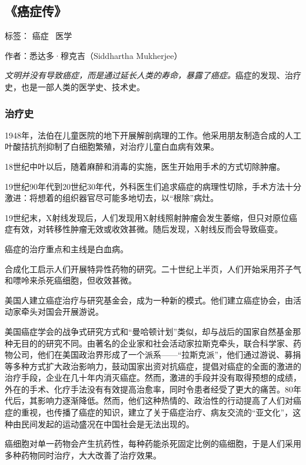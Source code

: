 \subsection{《癌症传》}

标签： 癌症 \  医学

作者：悉达多·穆克吉（Siddhartha Mukherjee）

\emph{文明并没有导致癌症，而是通过延长人类的寿命，暴露了癌症。}癌症的发现、治疗史，也是一部人类的医学史、技术史。

\subsubsection{治疗史}

\begin{itemize*}
	\item 1948年，法伯在儿童医院的地下开展解剖病理的工作。他采用朋友制造合成的人工叶酸拮抗剂抑制了白细胞繁殖，对治疗儿童白血病有效果。
	\item 18世纪中叶以后，随着麻醉和消毒的实施，医生开始用手术的方式切除肿瘤。
	\item 19世纪90年代到20世纪30年代，外科医生们追求癌症的病理性切除，手术方法十分激进：将想着的组织器官尽可能多地切去，以“根除”病灶。
	\item 19世纪末，X射线发现后，人们发现用X射线照射肿瘤会发生萎缩，但只对原位癌症有效，对转移性肿瘤无效或收效甚微。随后发现，X射线反而会导致癌变。
	\item 癌症的治疗重点和主线是白血病。
	\item 合成化工启示人们开展特异性药物的研究。二十世纪上半页，人们开始采用芥子气和嘌呤来杀死癌细胞，但收效甚微。
	\item 美国人建立癌症治疗与研究基金会，成为一种新的模式。他们建立癌症协会，由活动家牵头对国会开展游说。
	\item 美国癌症学会的战争式研究方式和“曼哈顿计划”类似，却与战后的国家自然基金那种无目的的研究不同。由著名的企业家和社会活动家拉斯克牵头，联合科学家、药物公司，他们在美国政治界形成了一个派系——“拉斯克派”，他们通过游说、募捐等多种方式扩大政治影响力，鼓动国家出资对抗癌症，提倡对癌症的全面的激进的治疗手段，企业在几十年内消灭癌症。然而，激进的手段并没有取得预想的成绩，外在的手术、化疗手法没有有效提高治愈率，同时令患者经受了更大的痛苦。80年代后，其影响力逐渐降低。然而，他们这种热情的、政治性的行动提高了人们对癌症的重视，也传播了癌症的知识，建立了关于癌症治疗、病友交流的“亚文化”，这种由民间发起的运动盛况在中国社会是无法出现的。
	\item 癌细胞对单一药物会产生抗药性，每种药能杀死固定比例的癌细胞，于是人们采用多种药物同时治疗，大大改善了治疗效果。

\end{itemize*}
